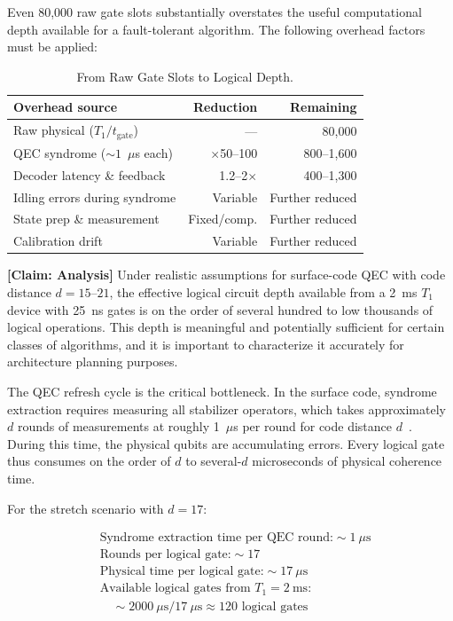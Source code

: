 \documentclass[conference]{IEEEtran}
\begin{document}
Even 80,000 raw gate slots substantially overstates the useful computational depth available for a fault-tolerant algorithm. The following overhead factors must be applied:

\begin{table}[htbp]
\centering
\caption{From Raw Gate Slots to Logical Depth.}
\label{tab:depth_reduction}
\begin{tabular}{lrr}
\toprule
\textbf{Overhead source} & \textbf{Reduction} & \textbf{Remaining} \\
\midrule
Raw physical ($T_1/t_{\text{gate}}$) & --- & 80,000 \\
QEC syndrome (${\sim}1$~$\mu$s each) & $\times$50--100 & 800--1,600 \\
Decoder latency \& feedback & 1.2--2$\times$ & 400--1,300 \\
Idling errors during syndrome & Variable & Further reduced \\
State prep \& measurement & Fixed/comp. & Further reduced \\
Calibration drift & Variable & Further reduced \\
\bottomrule
\end{tabular}
\end{table}

\textbf{[Claim: Analysis]} Under realistic assumptions for surface-code QEC with code distance $d = 15$--$21$, the effective logical circuit depth available from a 2~ms $T_1$ device with 25~ns gates is on the order of several hundred to low thousands of logical operations. This depth is meaningful and potentially sufficient for certain classes of algorithms, and it is important to characterize it accurately for architecture planning purposes.

The QEC refresh cycle is the critical bottleneck. In the surface code, syndrome extraction requires measuring all stabilizer operators, which takes approximately $d$ rounds of measurements at roughly 1~$\mu$s per round for code distance $d$~\cite{sheldon2016}. During this time, the physical qubits are accumulating errors. Every logical gate thus consumes on the order of $d$ to several-$d$ microseconds of physical coherence time.

For the stretch scenario with $d = 17$:

\begin{align}
&\text{Syndrome extraction time per QEC round:} \sim 1~\mu\text{s} \nonumber \\
&\text{Rounds per logical gate:} \sim 17 \nonumber \\
&\text{Physical time per logical gate:} \sim 17~\mu\text{s} \nonumber \\
&\text{Available logical gates from } T_1 = 2~\text{ms:} \nonumber \\
&\quad \sim 2000~\mu\text{s} / 17~\mu\text{s} \approx 120 \text{ logical gates} \nonumber
\end{align}
\end{document}
